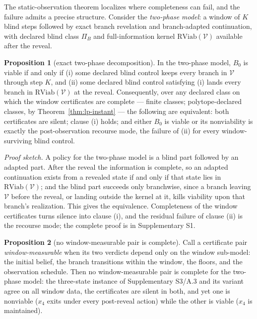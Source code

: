 \documentclass[10pt,twocolumn]{article}
\theoremstyle{definition}
\newtheorem{proposition}{Proposition}
\begin{document}
\medskip
The static-observation theorem localizes where completeness can fail, and the failure
admits a precise structure. Consider the \emph{two-phase model}: a window of \(K\) blind
steps followed by exact branch revelation and branch-adapted continuation, with declared
blind class \(\Pi_{B}\) and full-information kernel \(\mathrm{RViab}(\mathcal{V})\)
available after the reveal.

\begin{proposition}[exact two-phase decomposition]\label{prop:decomposition}
In the two-phase model, \(B_{0}\) is viable if and only if (i) some declared blind control
keeps every branch in \(\mathcal{V}\) through step \(K\), and (ii) some declared blind
control satisfying (i) lands every branch in \(\mathrm{RViab}(\mathcal{V})\) at the reveal.
Consequently, over any declared class on which the window certificates are complete ---
finite classes; polytope-declared classes, by Theorem~\ref{thm:lp-instant} --- the following
are equivalent: both certificates are silent; clause (i) holds; and either \(B_{0}\) is
viable or its nonviability is exactly the post-observation recourse mode, the failure of
(ii) for every window-surviving blind control.
\end{proposition}

\emph{Proof sketch.} A policy for the two-phase model is a blind part followed by an
adapted part. After the reveal the information is complete, so an adapted continuation
exists from a revealed state if and only if that state lies in
\(\mathrm{RViab}(\mathcal{V})\); and the blind part succeeds only branchwise, since a branch
leaving \(\mathcal{V}\) before the reveal, or landing outside the kernel at it, kills
viability upon that branch's realization. This gives the equivalence. Completeness of the
window certificates turns silence into clause (i), and the residual failure of
clause (ii) is the recourse mode; the complete proof is in Supplementary S1.

\begin{proposition}[no window-measurable pair is complete]\label{prop:window-nogo}
Call a certificate pair \emph{window-measurable} when its two verdicts depend only on the
window sub-model: the initial belief, the branch transitions within the window, the floors,
and the observation schedule. Then no window-measurable pair is complete for the two-phase
model: the three-state instance of Supplementary S3/A.3 and its variant agree on all window
data, the certificates are silent in both, and yet one is nonviable (\(x_{4}\) exits under
every post-reveal action) while the other is viable (\(x_{4}\) is maintained).
\end{proposition}
\end{document}
